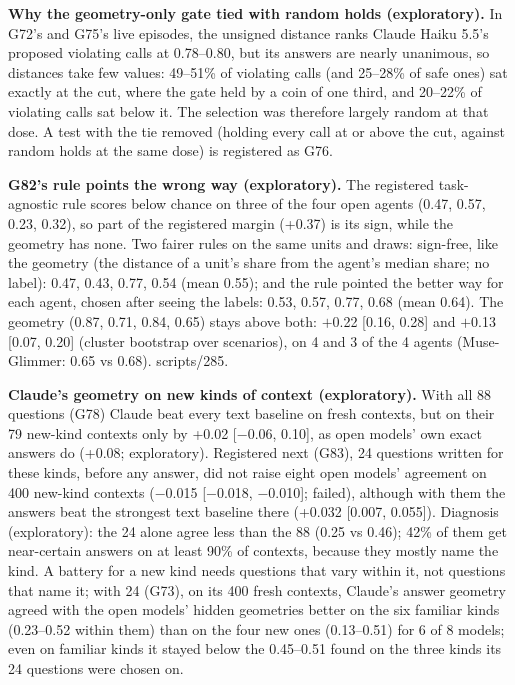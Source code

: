 \textbf{Why the geometry-only gate tied with random holds (exploratory).} In G72's and G75's live episodes, the unsigned distance ranks Claude Haiku 5.5's proposed violating calls at 0.78--0.80, but its answers are nearly unanimous, so distances take few values: 49--51\% of violating calls (and 25--28\% of safe ones) sat exactly at the cut, where the gate held by a coin of one third, and 20--22\% of violating calls sat below it. The selection was therefore largely random at that dose. A test with the tie removed (holding every call at or above the cut, against random holds at the same dose) is registered as G76.

\textbf{G82's rule points the wrong way (exploratory).} The registered task-agnostic rule scores below chance on three of the four open agents (0.47, 0.57, 0.23, 0.32), so part of the registered margin (+0.37) is its sign, while the geometry has none. Two fairer rules on the same units and draws: sign-free, like the geometry (the distance of a unit's share from the agent's median share; no label): 0.47, 0.43, 0.77, 0.54 (mean 0.55); and the rule pointed the better way for each agent, chosen after seeing the labels: 0.53, 0.57, 0.77, 0.68 (mean 0.64). The geometry (0.87, 0.71, 0.84, 0.65) stays above both: $+$0.22 [0.16, 0.28] and $+$0.13 [0.07, 0.20] (cluster bootstrap over scenarios), on 4 and 3 of the 4 agents (Muse-Glimmer: 0.65 vs 0.68). scripts/285.

\textbf{Claude's geometry on new kinds of context (exploratory).} With all 88 questions (G78) Claude beat every text baseline on fresh contexts, but on their 79 new-kind contexts only by +0.02 [$-$0.06, 0.10], as open models' own exact answers do (+0.08; exploratory). Registered next (G83), 24 questions written for these kinds, before any answer, did not raise eight open models' agreement on 400 new-kind contexts ($-$0.015 [$-$0.018, $-$0.010]; failed), although with them the answers beat the strongest text baseline there (+0.032 [0.007, 0.055]). Diagnosis (exploratory): the 24 alone agree less than the 88 (0.25 vs 0.46); 42\% of them get near-certain answers on at least 90\% of contexts, because they mostly name the kind. A battery for a new kind needs questions that vary within it, not questions that name it; with 24 (G73), on its 400 fresh contexts, Claude's answer geometry agreed with the open models' hidden geometries better on the six familiar kinds (0.23--0.52 within them) than on the four new ones (0.13--0.51) for 6 of 8 models; even on familiar kinds it stayed below the 0.45--0.51 found on the three kinds its 24 questions were chosen on.
